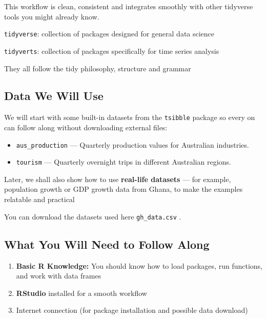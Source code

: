 \documentclass[
  letterpaper,
  DIV=11,
  numbers=noendperiod]{scrreprt}
\providecommand{\tightlist}{%
  \setlength{\itemsep}{0pt}\setlength{\parskip}{0pt}}\usepackage{longtable,booktabs,array}
\begin{document}
This workflow is clean, consistent and integrates smoothly with other
tidyverse tools you might already know.

\begin{tcolorbox}[enhanced jigsaw, rightrule=.15mm, opacitybacktitle=0.6, breakable, colframe=quarto-callout-tip-color-frame, opacityback=0, colbacktitle=quarto-callout-tip-color!10!white, leftrule=.75mm, titlerule=0mm, toprule=.15mm, coltitle=black, colback=white, bottomrule=.15mm, left=2mm, bottomtitle=1mm, arc=.35mm, toptitle=1mm, title=\textcolor{quarto-callout-tip-color}{\faLightbulb}\hspace{0.5em}{Tip}]

\texttt{tidyverse}: collection of packages designed for general data
science

\texttt{tidyverts}: collection of packages specifically for time series
analysis

They all follow the tidy philosophy, structure and grammar

\end{tcolorbox}

\subsection{Data We Will Use}\label{data-we-will-use}

We will start with some built-in datasets from the \texttt{tsibble}
package so every on can follow along without downloading external files:

\begin{itemize}
\tightlist
\item
  \texttt{aus\_production} --- Quarterly production values for
  Australian industries.
\item
  \texttt{tourism} --- Quarterly overnight trips in different Australian
  regions.
\end{itemize}

Later, we shall also show how to use \textbf{real-life datasets} --- for
example, population growth or GDP growth data from Ghana, to make the
examples relatable and practical

You can download the datasets used here \texttt{gh\_data.csv} .

\subsection{What You Will Need to Follow
Along}\label{what-you-will-need-to-follow-along}

\begin{enumerate}
\def\labelenumi{\arabic{enumi}.}
\tightlist
\item
  \textbf{Basic R Knowledge:} You should know how to load packages, run
  functions, and work with data frames
\item
  \textbf{RStudio} installed for a smooth workflow
\item
  Internet connection (for package installation and possible data
  download)
\end{enumerate}
\end{document}
